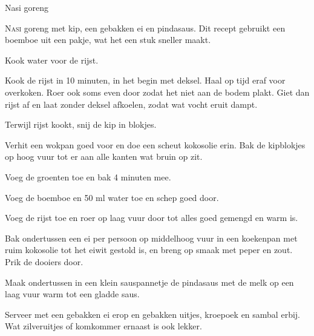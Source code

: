 \begin{recipe}{Nasi goreng}


\lettrine{N}{asi} goreng met kip, een gebakken ei en pindasaus. Dit recept gebruikt
een boemboe uit een pakje, wat het een stuk sneller maakt.

\begin{ingredients}
\end{ingredients}

\begin{steps}
  \item Kook water voor de rijst.
  \item Kook de rijst in 10 minuten, in het begin met deksel. Haal op tijd eraf voor overkoken. Roer ook soms even door zodat het niet aan de bodem plakt.
        Giet dan rijst af en laat zonder deksel afkoelen, zodat wat vocht eruit dampt.
  \item Terwijl rijst kookt, snij de kip in blokjes.
  \item Verhit een wokpan goed voor en doe een scheut kokosolie erin. Bak de
        kipblokjes op hoog vuur tot er aan alle kanten wat bruin op zit.
  \item Voeg de groenten toe en bak 4 minuten mee.
  \item Voeg de boemboe en 50 ml water toe en schep goed door.
  \item Voeg de rijst toe en roer op laag vuur door tot alles goed gemengd en warm is.
  \item Bak ondertussen een ei per persoon op middelhoog vuur in een koekenpan
        met ruim kokosolie tot het eiwit gestold is, en breng op smaak met
        peper en zout. Prik de dooiers door.
  \item Maak ondertussen in een klein sauspannetje de pindasaus met de melk op een
        laag vuur warm tot een gladde saus.
  \item Serveer met een gebakken ei erop en gebakken uitjes, kroepoek en sambal
        erbij. Wat zilveruitjes of komkommer ernaast is ook lekker.
\end{steps}

\end{recipe}
